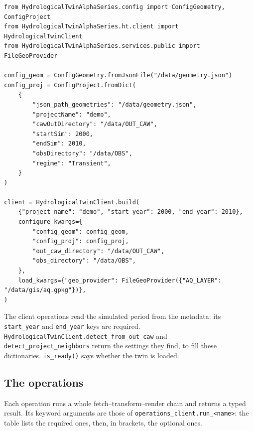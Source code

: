 \documentclass[11pt]{article}
\begin{document}
\begin{verbatim}
from HydrologicalTwinAlphaSeries.config import ConfigGeometry, ConfigProject
from HydrologicalTwinAlphaSeries.ht.client import HydrologicalTwinClient
from HydrologicalTwinAlphaSeries.services.public import FileGeoProvider

config_geom = ConfigGeometry.fromJsonFile("/data/geometry.json")
config_proj = ConfigProject.fromDict(
    {
        "json_path_geometries": "/data/geometry.json",
        "projectName": "demo",
        "cawOutDirectory": "/data/OUT_CAW",
        "startSim": 2000,
        "endSim": 2010,
        "obsDirectory": "/data/OBS",
        "regime": "Transient",
    }
)

client = HydrologicalTwinClient.build(
    {"project_name": "demo", "start_year": 2000, "end_year": 2010},
    configure_kwargs={
        "config_geom": config_geom,
        "config_proj": config_proj,
        "out_caw_directory": "/data/OUT_CAW",
        "obs_directory": "/data/OBS",
    },
    load_kwargs={"geo_provider": FileGeoProvider({"AQ_LAYER": "/data/gis/aq.gpkg"})},
)
\end{verbatim}

The client operations read the simulated period from the metadata: its
\texttt{start\_year} and \texttt{end\_year} keys are required.
\texttt{HydrologicalTwinClient.detect\_from\_out\_caw} and
\texttt{detect\_project\_neighbors} return the settings they find, to fill
these dictionaries. \texttt{is\_ready()} says whether the twin is loaded.

\subsection{The operations}

Each operation runs a whole fetch--transform--render chain and returns a typed
result. Its keyword arguments are those of
\texttt{operations\_client.run\_<name>}: the table lists the required ones,
then, in brackets, the optional ones.
\end{document}
